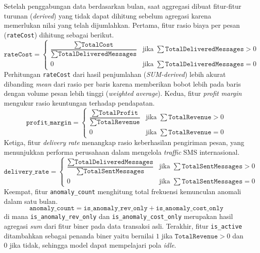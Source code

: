 Setelah penggabungan data berdasarkan bulan, saat aggregasi dibuat fitur-fitur turunan (\textit{derived}) yang tidak dapat dihitung sebelum agregasi karena memerlukan nilai yang telah dijumlahkan. Pertama, fitur rasio biaya per pesan (\texttt{rateCost}) dihitung sebagai berikut.
\begin{equation}
\texttt{rateCost} = 
\begin{cases}
\dfrac{\sum\texttt{TotalCost}}{\sum\texttt{TotalDeliveredMessages}} & \text{jika } \sum\texttt{TotalDeliveredMessages} > 0 \\[8pt]
0 & \text{jika } \sum\texttt{TotalDeliveredMessages} = 0
\end{cases}
\end{equation}
\noindent Perhitungan \texttt{rateCost} dari hasil penjumlahan (\textit{SUM-derived}) lebih akurat dibanding \textit{mean} dari rasio per baris karena memberikan bobot lebih pada baris dengan volume pesan lebih tinggi (\textit{weighted average}).
Kedua, fitur \textit{profit margin} mengukur rasio keuntungan terhadap pendapatan.
\begin{equation}
\texttt{profit\_margin} = 
\begin{cases}
\dfrac{\sum\texttt{TotalProfit}}{\sum\texttt{TotalRevenue}} & \text{jika } \sum\texttt{TotalRevenue} > 0 \\[8pt]
0 & \text{jika } \sum\texttt{TotalRevenue} = 0
\end{cases}
\end{equation}
Ketiga, fitur \textit{delivery rate} menangkap rasio keberhasilan pengiriman pesan, yang menunjukkan performa perusahaan dalam mengelola \textit{traffic} SMS internasional.
\begin{equation}
\texttt{delivery\_rate} = 
\begin{cases}
\dfrac{\sum\texttt{TotalDeliveredMessages}}{\sum\texttt{TotalSentMessages}} & \text{jika } \sum\texttt{TotalSentMessages} > 0 \\[8pt]
0 & \text{jika } \sum\texttt{TotalSentMessages} = 0
\end{cases}
\end{equation}
Keempat, fitur \texttt{anomaly\_count} menghitung total frekuensi kemunculan anomali dalam satu bulan.
\begin{equation}
\texttt{anomaly\_count} = \texttt{is\_anomaly\_rev\_only} + \texttt{is\_anomaly\_cost\_only}
\end{equation}
\noindent di mana \texttt{is\_anomaly\_rev\_only} dan \texttt{is\_anomaly\_cost\_only} merupakan hasil agregasi \textit{sum} dari fitur biner pada data transaksi asli. Terakhir, fitur \texttt{is\_active} ditambahkan sebagai penanda biner yaitu bernilai $1$ jika $\texttt{TotalRevenue} > 0$ dan $0$ jika tidak, sehingga model dapat mempelajari pola \textit{idle}.


